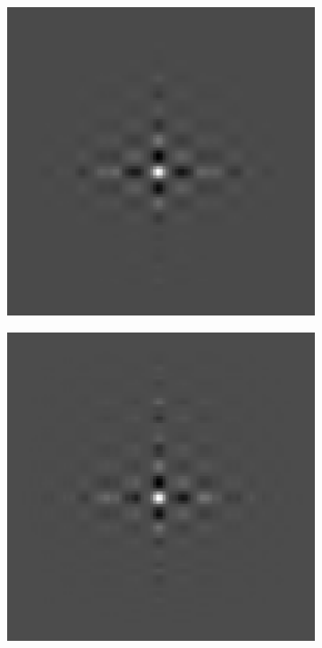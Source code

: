 \begin{figure}[htpb]
\begin{subfigure}{.25\textwidth}
\end{subfigure}%
\begin{subfigure}{.25\textwidth}
\includegraphics[width=1\textwidth]{img/GCRank1sigma150}
\end{subfigure}%
\begin{subfigure}{.25\textwidth}
\includegraphics[width=1\textwidth]{img/GCRank1sigma300}

\end{subfigure}
\end{figure}

